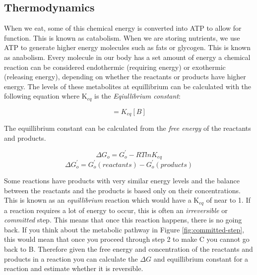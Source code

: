 \documentclass{tufte-handout}
\begin{document}
\subsection{Thermodynamics}

  When we eat, some of this chemical energy is converted into ATP to allow for function.  This is known as catabolism.  When we are storing nutrients, we use ATP to generate higher energy molecules such as fats or glycogen.  This is known as anabolism.  Every molecule in our body has a set amount of energy a chemical reaction can be considered endothermic (requiring energy) or exothermic (releasing energy), depending on whether the reactants or products have higher energy.  The levels of these metabolites at equillibrium can be calculated with the following equation where K$_{eq}$ is the \emph{Eqiullibrium constant}:

\begin{equation}
[A]=K_{eq}[B]
\end{equation}

 The equillibrium constant can be calculated from the \emph{free energy} of the reactants and products.

\begin{equation}
\Delta G_{o} = G^{'}_{o} - R T ln K_{eq}
\end{equation}
\begin{equation}
\Delta G^{'}_{o} = G^{'}_{o} (reactants) - G^{'}_{o} (products) 
 \end{equation}


Some reactions have products with very similar energy levels and the balance between the reactants and the products is based only on their concentrations.  This is known as an \emph{equillibrium} reaction which would have a K$_{eq}$ of near to 1.  If a reaction requires a lot of energy to occur, this is often an \emph{irreversible} or \emph{committed} step.  This means that once this reaction happens, there is no going back.  If you think about the metabolic pathway in Figure \ref{fig:committed-step}, this would mean that once you proceed through step 2 to make  C you cannot go back to B.  Therefore given the free energy and concentration of the reactants and products in a reaction you can calculate the $\Delta G$ and equillibrium constant for a reaction and estimate whether it is reversible.
\end{document}
